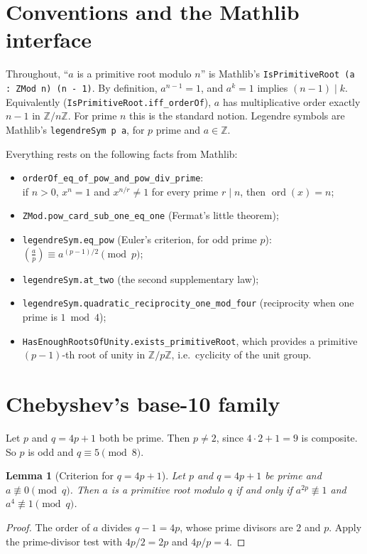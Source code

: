 \documentclass[11pt]{article}
\newtheorem{lemma}[theorem]{Lemma}
\theoremstyle{remark}
\newcommand{\leg}[2]{\left(\frac{#1}{#2}\right)}
\newcommand{\lean}[1]{\texttt{#1}}
\begin{document}
\section{Conventions and the Mathlib interface}

Throughout, ``$a$ is a primitive root modulo $n$'' is Mathlib's
\lean{IsPrimitiveRoot (a : ZMod n) (n - 1)}. By definition, $a^{n-1}=1$, and $a^{k}=1$ implies
$(n-1)\mid k$. Equivalently (\lean{IsPrimitiveRoot.iff\_orderOf}), $a$ has multiplicative
order exactly $n-1$ in $\mathbb{Z}/n\mathbb{Z}$. For prime $n$ this is the standard notion.
Legendre symbols are Mathlib's \lean{legendreSym p a}, for $p$ prime and $a\in\mathbb{Z}$.

Everything rests on the following facts from Mathlib:
\begin{itemize}
\item \lean{orderOf\_eq\_of\_pow\_and\_pow\_div\_prime}:\\ if $n>0$, $x^n=1$ and $x^{n/r}\neq 1$ for every
prime $r\mid n$, then $\operatorname{ord}(x)=n$;
\item \lean{ZMod.pow\_card\_sub\_one\_eq\_one} (Fermat's little theorem);
\item \lean{legendreSym.eq\_pow} (Euler's criterion, for odd prime $p$): $\leg{a}{p}\equiv a^{(p-1)/2}\pmod p$;
\item \lean{legendreSym.at\_two} (the second supplementary law);
\item \lean{legendreSym.quadratic\_reciprocity\_one\_mod\_four} (reciprocity when one prime is $1\bmod 4$);
\item \lean{HasEnoughRootsOfUnity.exists\_primitiveRoot}, which provides a primitive $(p-1)$-th
root of unity in $\mathbb{Z}/p\mathbb{Z}$, i.e.\ cyclicity of the unit group.
\end{itemize}

\section{Chebyshev's base-10 family}

Let $p$ and $q=4p+1$ both be prime. Then $p\neq 2$, since $4\cdot 2+1=9$ is composite. So $p$ is
odd and $q\equiv 5\pmod 8$.

\begin{lemma}[Criterion for $q=4p+1$]\label{lem:crit4}
Let $p$ and $q=4p+1$ be prime and $a\not\equiv 0\pmod q$. Then $a$ is a primitive root modulo
$q$ if and only if $a^{2p}\not\equiv 1$ and $a^4\not\equiv 1\pmod q$.
\end{lemma}
\begin{proof}
The order of $a$ divides $q-1=4p$, whose prime divisors are $2$ and $p$. Apply the prime-divisor
test with $4p/2=2p$ and $4p/p=4$.
\end{proof}
\end{document}
